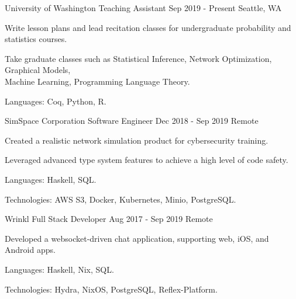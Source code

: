 

\begin{cventries}

  \cventry
    {University of Washington}
    {Teaching Assistant}
    {Sep 2019 - Present}
    {Seattle, WA}
    {
      \begin{cvitems}
        \item Write lesson plans and lead recitation classes for undergraduate
          probability and statistics courses.
        \item Take graduate classes such as Statistical Inference, Network
          Optimization, Graphical Models,\\ Machine Learning, Programming
          Language Theory.
        \item Languages: Coq, Python, R.
      \end{cvitems}
    }

  \cventry
    {SimSpace Corporation}
    {Software Engineer}
    {Dec 2018 - Sep 2019}
    {Remote}
    {
      \begin{cvitems}
        \item Created a realistic network simulation product for cybersecurity
          training.
        \item Leveraged advanced type system features to achieve a high level of
          code safety.
        \item Languages: Haskell, SQL.
        \item Technologies: AWS S3, Docker, Kubernetes, Minio, PostgreSQL.
      \end{cvitems}
    }


  \cventry
    {Wrinkl}
    {Full Stack Developer}
    {Aug 2017 - Sep 2019}
    {Remote}
    {
      \begin{cvitems}
        \item Developed a websocket-driven chat application, supporting
          web, iOS, and Android apps.
        \item Languages: Haskell, Nix, SQL.
        \item Technologies: Hydra, NixOS, PostgreSQL, Reflex-Platform.
      \end{cvitems}
    }


\end{cventries}
